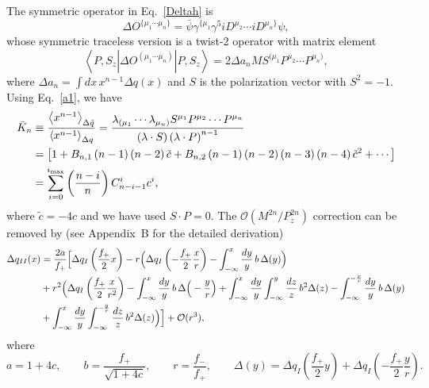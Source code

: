 The symmetric operator in Eq.~\ref{Deltah} is
%
\begin{equation}
\Delta O^{\{\mu_1\cdots \mu_n\}} = 
  \bar{\psi} \gamma^{\{\mu_1}\gamma^5iD^{\mu_2}\cdots iD^{\mu_n\}} \psi ,
\end{equation}
%
whose symmetric traceless version is a twist-2 operator with matrix element 
%
\begin{equation}
\left\langle P,S_z\left\vert \Delta O^{(\mu_1\cdots \mu_n)}
  \right\vert P,S_z\right\rangle =
  2 \Delta a_n MS^{(\mu_1}P^{\mu_2}\cdots P^{\mu_n)},
\end{equation}
%
where $\Delta a_n=\int\!dx\,x^{n-1}\Delta q(x)$ and $S$ is the polarization
vector with $S^2=-1$. Using Eq.~\ref{a1}, we have
%
\begin{align}
\bar{K}_n &\equiv\frac{\left\langle x^{n-1}\right\rangle_{\Delta \tilde q}}{\left\langle x^{n-1}\right\rangle_{\Delta q}}=
  \frac{\lambda_{(\mu_1} \cdots \lambda_{\mu_n)} S^{\mu_1}P^{\mu_2}\cdots P^{\mu_n}}
       {\left(\lambda \cdot S\right) \left(\lambda \cdot P\right)^{n-1}} \notag \\
&= \left[ 1+B_{n,1} \left(n-1\right) \left(n-2\right) \tilde{c}
  + B_{n,2}\left(n-1\right) \left(n-2\right) \left(n-3\right) \left(n-4\right)
    \tilde{c}^2
  + \cdots \right]  \notag \\
&= \sum_{i=0}^{i_{\text{max}}} \left(\frac{n-i}{n}\right) C_{n-i-1}^i
  c^i,  \label{Knbar}
\end{align}
%
where $\tilde{c}=-4c$ and we have used $S\cdot P=0$. The $\mathcal{O}(M^{2n}/P_z^{2n})$
correction can be removed by (see Appendix~B for the detailed derivation)
%
\begin{align}
\Delta q_{II}(x)&=\frac{2a}{f_+}\Big[\Delta q_I\left(\frac{f_+}{2}x\right)-r\Big(\Delta q_I\left(-\frac{f_+}{2}\frac{x}{r}\right)-\int_{-\infty}^x \frac{dy}{y} \,b\, \Delta(y)\Big)\nonumber\\
&+r^2\Big(\Delta q_I\left(\frac{f_+}{2}\frac{x}{r^2}\right)-\int_{-\infty}^x \frac{dy}{y} \, b\,\Delta\Big(-\frac{y}{r}\Big)+\int_{-\infty}^x \frac{dy}{y}\int_{-\infty}^y \frac{dz}{z}\, b^2 \Delta(z)-\int_{-\infty}^{-\frac{x}{r}}\frac{dy}{y}\, b\,\Delta(y)\nonumber\\
&+\int_{-\infty}^x \frac{dy}{y}\int_{-\infty}^{-\frac{y}{r}}\frac{dz}{z}\, b^2\Delta(z)\Big)\Big]+\mathcal O(r^3),
\label{h_mass}
\end{align}
where
\begin{equation}
a=1+4c, \hspace{2em} b=\frac{f_+}{\sqrt{1+4c}}, \hspace{2em} r=\frac{f_-}{f_+}, \hspace{2em} \Delta(y)=\Delta q_I\left(\frac{f_+}{2}y\right)+\Delta q_I\left(-\frac{f_+}{2}\frac{y}{r}\right).
\end{equation}

